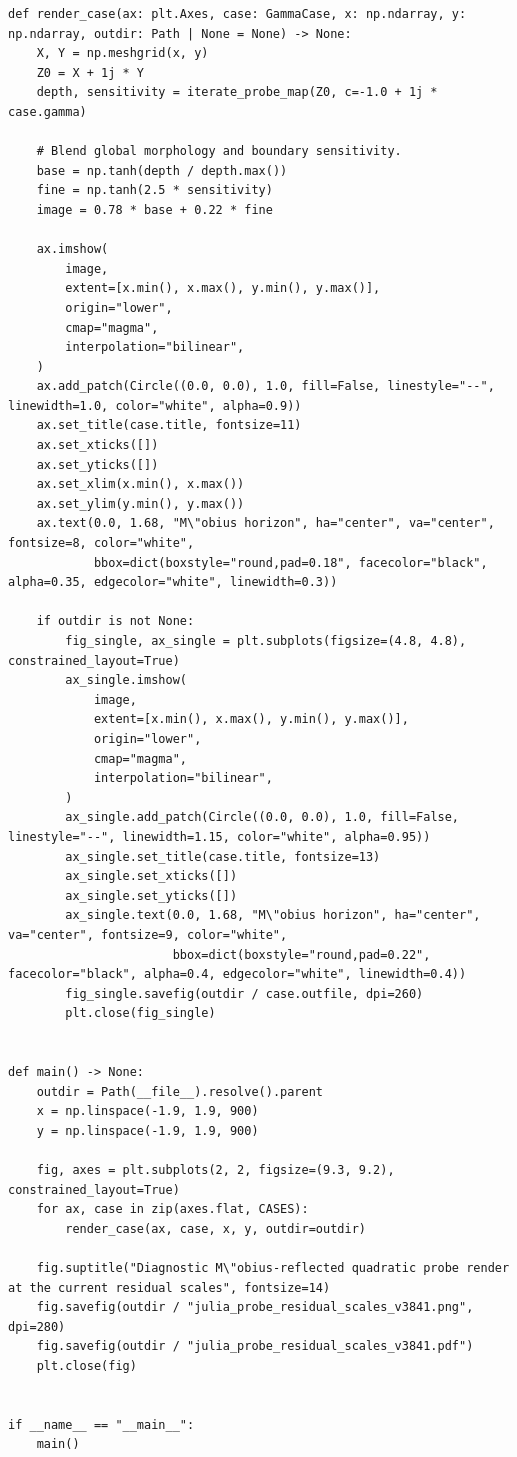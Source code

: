 \begin{lstlisting}[style=pyappendix]
def render_case(ax: plt.Axes, case: GammaCase, x: np.ndarray, y: np.ndarray, outdir: Path | None = None) -> None:
    X, Y = np.meshgrid(x, y)
    Z0 = X + 1j * Y
    depth, sensitivity = iterate_probe_map(Z0, c=-1.0 + 1j * case.gamma)

    # Blend global morphology and boundary sensitivity.
    base = np.tanh(depth / depth.max())
    fine = np.tanh(2.5 * sensitivity)
    image = 0.78 * base + 0.22 * fine

    ax.imshow(
        image,
        extent=[x.min(), x.max(), y.min(), y.max()],
        origin="lower",
        cmap="magma",
        interpolation="bilinear",
    )
    ax.add_patch(Circle((0.0, 0.0), 1.0, fill=False, linestyle="--", linewidth=1.0, color="white", alpha=0.9))
    ax.set_title(case.title, fontsize=11)
    ax.set_xticks([])
    ax.set_yticks([])
    ax.set_xlim(x.min(), x.max())
    ax.set_ylim(y.min(), y.max())
    ax.text(0.0, 1.68, "M\"obius horizon", ha="center", va="center", fontsize=8, color="white",
            bbox=dict(boxstyle="round,pad=0.18", facecolor="black", alpha=0.35, edgecolor="white", linewidth=0.3))

    if outdir is not None:
        fig_single, ax_single = plt.subplots(figsize=(4.8, 4.8), constrained_layout=True)
        ax_single.imshow(
            image,
            extent=[x.min(), x.max(), y.min(), y.max()],
            origin="lower",
            cmap="magma",
            interpolation="bilinear",
        )
        ax_single.add_patch(Circle((0.0, 0.0), 1.0, fill=False, linestyle="--", linewidth=1.15, color="white", alpha=0.95))
        ax_single.set_title(case.title, fontsize=13)
        ax_single.set_xticks([])
        ax_single.set_yticks([])
        ax_single.text(0.0, 1.68, "M\"obius horizon", ha="center", va="center", fontsize=9, color="white",
                       bbox=dict(boxstyle="round,pad=0.22", facecolor="black", alpha=0.4, edgecolor="white", linewidth=0.4))
        fig_single.savefig(outdir / case.outfile, dpi=260)
        plt.close(fig_single)


def main() -> None:
    outdir = Path(__file__).resolve().parent
    x = np.linspace(-1.9, 1.9, 900)
    y = np.linspace(-1.9, 1.9, 900)

    fig, axes = plt.subplots(2, 2, figsize=(9.3, 9.2), constrained_layout=True)
    for ax, case in zip(axes.flat, CASES):
        render_case(ax, case, x, y, outdir=outdir)

    fig.suptitle("Diagnostic M\"obius-reflected quadratic probe render at the current residual scales", fontsize=14)
    fig.savefig(outdir / "julia_probe_residual_scales_v3841.png", dpi=280)
    fig.savefig(outdir / "julia_probe_residual_scales_v3841.pdf")
    plt.close(fig)


if __name__ == "__main__":
    main()

\end{lstlisting}
\endgroup

